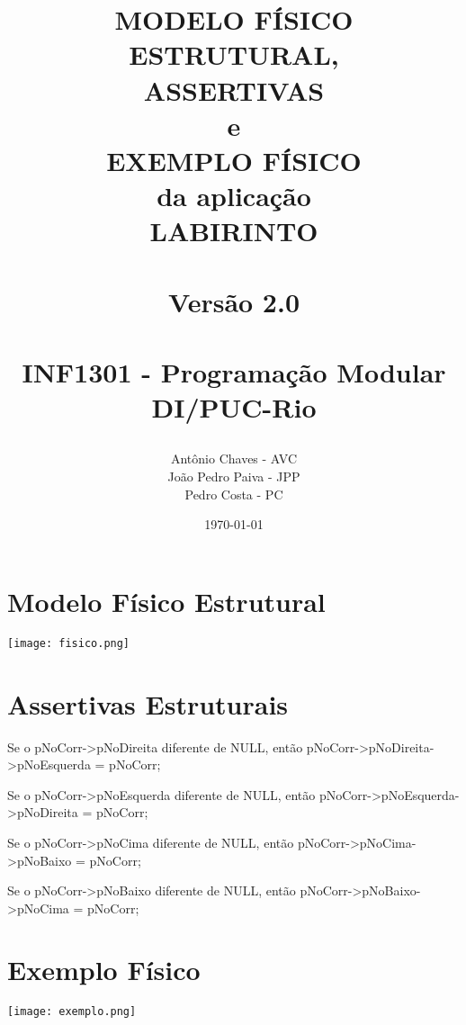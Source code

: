 \documentclass[a4paper,12pt,oneside]{book}
\title{
  \begin{flushright}
  \Huge{MODELO FÍSICO ESTRUTURAL,}\\
  ASSERTIVAS\\
  e\\
  EXEMPLO FÍSICO\\
  da aplicação\\
  LABIRINTO\\
  ~\\
  \LARGE{Versão 2.0}\\
  ~\\
  INF1301 - Programação Modular\\ DI/PUC-Rio
  \end{flushright}
}
\author{Antônio Chaves - AVC\\João Pedro Paiva - JPP\\Pedro Costa - PC}
\date{\today}
\begin{document}
\frontmatter
\maketitle

\tableofcontents



\mainmatter

\chapter{Modelo Físico Estrutural}

\begin{center}

    \texttt{[image: fisico.png]}

\end{center}

\chapter{Assertivas Estruturais}\setlength{\parskip}{1\baselineskip}

    Se o pNoCorr->pNoDireita diferente de NULL, então pNoCorr->pNoDireita->pNoEsquerda = pNoCorr;

    Se o pNoCorr->pNoEsquerda diferente de NULL, então pNoCorr->pNoEsquerda->pNoDireita = pNoCorr;

    Se o pNoCorr->pNoCima diferente de NULL, então pNoCorr->pNoCima->pNoBaixo = pNoCorr;

    Se o pNoCorr->pNoBaixo diferente de NULL, então pNoCorr->pNoBaixo->pNoCima = pNoCorr;
    \setlength{\parskip}{1pt}
\chapter{Exemplo Físico}

\begin{center}
    
    \texttt{[image: exemplo.png]}

\end{center}

% 
% 
% 
% 
% 
% 
% 
\end{document}
